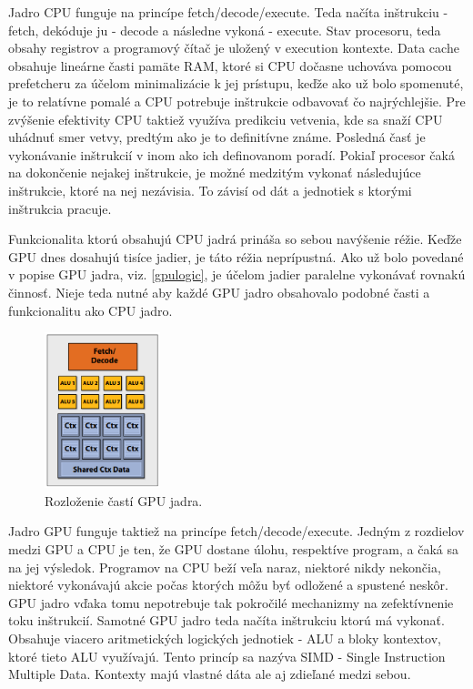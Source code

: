 Jadro CPU funguje na princípe fetch/decode/execute. Teda načíta inštrukciu - fetch, dekóduje ju - decode a následne vykoná - execute. Stav procesoru, teda obsahy registrov a programový čítač je uložený v execution kontexte. Data cache obsahuje lineárne časti pamäte RAM, ktoré si CPU dočasne uchováva pomocou prefetcheru za účelom minimalizácie k jej prístupu, keďže ako už bolo spomenuté, je to relatívne pomalé a CPU potrebuje inštrukcie odbavovať čo najrýchlejšie. Pre zvýšenie efektivity CPU taktiež využíva predikciu vetvenia, kde sa snaží CPU uhádnuť smer vetvy, predtým ako je to definitívne známe. Posledná časť je vykonávanie inštrukcií v inom ako ich definovanom poradí. Pokiaľ procesor čaká na dokončenie nejakej inštrukcie, je možné medzitým vykonať následujúce inštrukcie, ktoré na nej nezávisia. To závisí od dát a jednotiek s ktorými inštrukcia pracuje.

Funkcionalita ktorú obsahujú CPU jadrá prináša so sebou navýšenie réžie. Keďže GPU dnes dosahujú tisíce jadier, je táto réžia neprípustná. Ako už bolo povedané v popise GPU jadra, viz. \ref{gpulogic}, je účelom jadier paralelne vykonávať rovnakú činnosť. Nieje teda nutné aby každé GPU jadro obsahovalo podobné časti a funkcionalitu ako CPU jadro.

\begin{figure}[H]
	\centering
	\includegraphics[width=0.3\textwidth]{obrazky-figures/gpucore.eps}
	\caption{Rozloženie častí GPU jadra.}
	\label{gpucore}
\end{figure}

Jadro GPU funguje taktiež na princípe fetch/decode/execute. Jedným z rozdielov medzi GPU a CPU je ten, že GPU dostane úlohu, respektíve program, a čaká sa na jej výsledok. Programov na CPU beží veľa naraz, niektoré nikdy nekončia, niektoré vykonávajú akcie počas ktorých môžu byť odložené a spustené neskôr. GPU jadro vďaka tomu nepotrebuje tak pokročilé mechanizmy na zefektívnenie toku inštrukcií. Samotné GPU jadro teda načíta inštrukciu ktorú má vykonať. Obsahuje viacero aritmetických logických jednotiek - ALU a bloky kontextov, ktoré tieto ALU využívajú. Tento princíp sa nazýva SIMD - Single Instruction Multiple Data. Kontexty majú vlastné dáta ale aj zdieľané medzi sebou.

